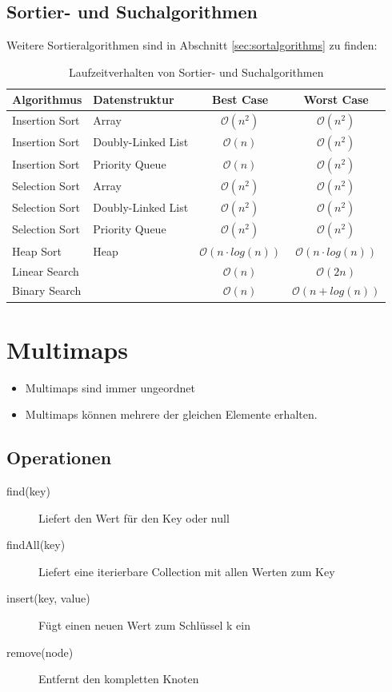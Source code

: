 \subsection{Sortier- und Suchalgorithmen}
Weitere Sortieralgorithmen sind in Abschnitt \ref{sec:sortalgorithms} zu finden:
\begin{table}[h!]
	\centering
	\begin{tabu} to \linewidth {l l c c}
		\toprule
		Algorithmus & Datenstruktur & Best Case  & Worst Case\\
		\midrule
		Insertion Sort & Array & $\mathcal{O}(n^2)$ & $\mathcal{O}(n^2)$  \\
		Insertion Sort & Doubly-Linked List & $\mathcal{O}(n)$ & $\mathcal{O}(n^2)$  \\
		Insertion Sort & Priority Queue & $\mathcal{O}(n)$ & $\mathcal{O}(n^2)$  \\
		Selection Sort & Array & $\mathcal{O}(n^2)$ & $\mathcal{O}(n^2)$ \\
		Selection Sort & Doubly-Linked List & $\mathcal{O}(n^2)$ & $\mathcal{O}(n^2)$ \\
		Selection Sort & Priority Queue & $\mathcal{O}(n^2)$ & $\mathcal{O}(n^2)$ \\
		Heap Sort & Heap & $\mathcal{O}(n \cdot log(n))$ & $\mathcal{O}(n \cdot log(n))$ \\
		Linear Search & & $\mathcal{O}(n)$ & $\mathcal{O}(2n)$ \\
		Binary Search & & $\mathcal{O}(n)$ & $\mathcal{O}(n + log(n))$ \\
		\bottomrule
	\end{tabu}
	\caption{Laufzeitverhalten von Sortier- und Suchalgorithmen}
\end{table}


\section{Multimaps}
\begin{itemize}
	\item Multimaps sind immer ungeordnet
	\item Multimaps können mehrere der gleichen Elemente erhalten.
\end{itemize}

\subsection{Operationen}
\begin{description}
	\item[find(key)] Liefert den Wert für den Key oder null
	\item[findAll(key)] Liefert eine iterierbare Collection mit allen Werten zum Key
	\item[insert(key, value)] Fügt einen neuen Wert zum Schlüssel k ein
	\item[remove(node)] Entfernt den kompletten Knoten
\end{description}

